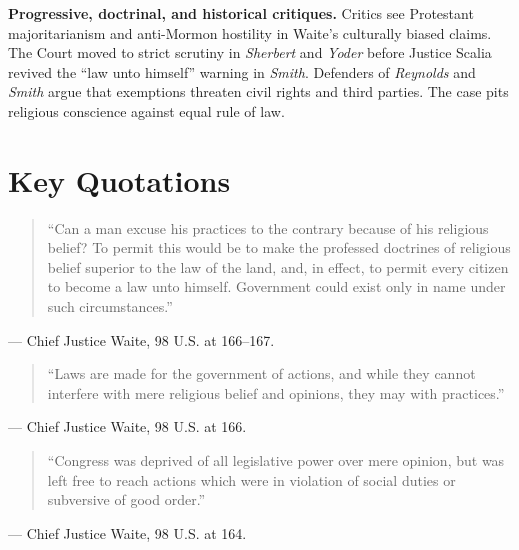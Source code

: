 \documentclass[12pt]{article}
\begin{document}
\textbf{Progressive, doctrinal, and historical critiques.} Critics see Protestant majoritarianism and anti-Mormon hostility in Waite's culturally biased claims. The Court moved to strict scrutiny in \textit{Sherbert} and \textit{Yoder} before Justice Scalia revived the ``law unto himself'' warning in \textit{Smith}. Defenders of \textit{Reynolds} and \textit{Smith} argue that exemptions threaten civil rights and third parties. The case pits religious conscience against equal rule of law.

\section{Key Quotations}

\begin{quote}
``Can a man excuse his practices to the contrary because of his religious belief? To permit this would be to make the professed doctrines of religious belief superior to the law of the land, and, in effect, to permit every citizen to become a law unto himself. Government could exist only in name under such circumstances.''
\end{quote}
\noindent --- Chief Justice Waite, 98 U.S. at 166--167.

\begin{quote}
``Laws are made for the government of actions, and while they cannot interfere with mere religious belief and opinions, they may with practices.''
\end{quote}
\noindent --- Chief Justice Waite, 98 U.S. at 166.

\begin{quote}
``Congress was deprived of all legislative power over mere opinion, but was left free to reach actions which were in violation of social duties or subversive of good order.''
\end{quote}
\noindent --- Chief Justice Waite, 98 U.S. at 164.
\end{document}
